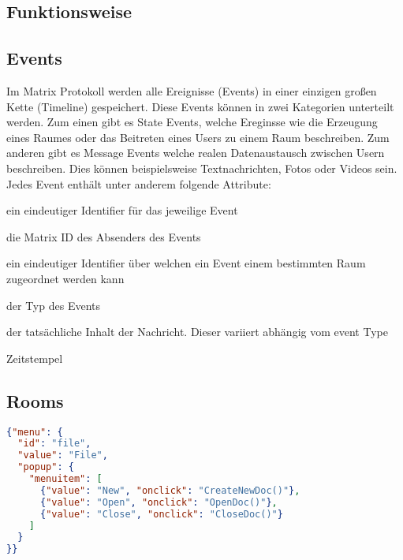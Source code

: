     \subsection{Funktionsweise}\label{subsec:funktionsweise}
%
%    

    \subsection{Events}\label{sec:events}
    Im Matrix Protokoll werden alle Ereignisse (Events) in einer einzigen großen Kette (Timeline) gespeichert. Diese Events können in zwei Kategorien unterteilt werden. Zum einen gibt es State Events, welche Ereginsse wie die Erzeugung eines Raumes oder das Beitreten eines Users zu einem Raum beschreiben.
    Zum anderen gibt es Message Events welche realen Datenaustausch zwischen Usern beschreiben. Dies können beispielsweise Textnachrichten, Fotos oder Videos sein. Jedes Event enthält unter anderem folgende Attribute:
    \begin{description}[leftmargin=!,labelwidth=3.5cm]
        \item [event\_id] ein eindeutiger Identifier für das jeweilige Event
        \item [sender] die Matrix ID des Absenders des Events
        \item [room\_id] ein eindeutiger Identifier über welchen ein Event einem bestimmten Raum zugeordnet werden kann
        \item [type] der Typ des Events
        \item [content] der tatsächliche Inhalt der Nachricht. Dieser variiert abhängig vom event Type
        \item [origin\_server\_ts] Zeitstempel
    \end{description}

    \subsection{Rooms}


    \begin{lstlisting}[language=json,firstnumber=1]
{"menu": {
  "id": "file",
  "value": "File",
  "popup": {
    "menuitem": [
      {"value": "New", "onclick": "CreateNewDoc()"},
      {"value": "Open", "onclick": "OpenDoc()"},
      {"value": "Close", "onclick": "CloseDoc()"}
    ]
  }
}}
    \end{lstlisting}


